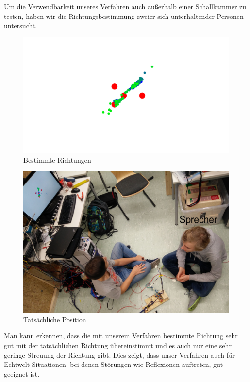 Um die Verwendbarkeit unseres Verfahren auch außerhalb einer Schallkammer zu testen, haben wir die Richtungsbestimmung zweier sich unterhaltender Personen untersucht.\\
\begin{minipage}{0.49\linewidth}
  \begin{figure}[H]
    \centering
    \includegraphics[width=\textwidth]{img/real_real_data}
    \caption{Bestimmte Richtungen}
    \label{fig:real_real_data}
  \end{figure}
\end{minipage}\hfill
\begin{minipage}{0.49\linewidth}
  \begin{figure}[H]
    \centering
    \includegraphics[width=\textwidth]{img/real_real}
    \caption{Tatsächliche Position}
    \label{fig:real_real}
  \end{figure}
\end{minipage}

Man kann erkennen, dass die mit unserem Verfahren bestimmte Richtung sehr gut mit der tatsächlichen Richtung übereinstimmt und es auch nur eine sehr geringe Streuung der Richtung gibt. Dies zeigt, dass unser Verfahren auch für Echtwelt Situationen, bei denen Störungen wie Reflexionen auftreten, gut geeignet ist.